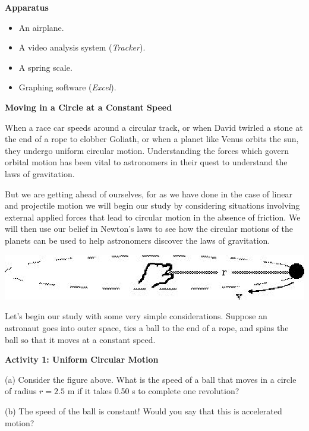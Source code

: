 \textbf{Apparatus}

\begin{itemize}
\item An airplane. 
\item A video analysis system (\textit{Tracker}). 
\item A spring scale. 
\item Graphing software (\textit{Excel}). 
\end{itemize}
\textbf{Moving in a Circle at a Constant Speed }

When a race car speeds around a circular track, or when David twirled a stone
at the end of a rope to clobber Goliath, or when a planet like Venus orbits
the sun, they undergo uniform circular motion. Understanding the forces which
govern orbital motion has been vital to astronomers in their quest to understand
the laws of gravitation. 

But we are getting ahead of ourselves, for as we have done in the case of linear
and projectile motion we will begin our study by considering situations involving
external applied forces that lead to circular motion in the absence of friction.
We will then use our belief in Newton's laws to see how the circular motions
of the planets can be used to help astronomers discover the laws of gravitation.

\vspace{0.3cm}
{\par\centering \includegraphics{centripetal/centripetal_fig2.eps} \par}
\vspace{0.3cm}

Let's begin our study with some very simple considerations. Suppose an astronaut
goes into outer space, ties a ball to the end of a rope, and spins the ball
so that it moves at a constant speed.

\textbf{Activity 1: Uniform Circular Motion }

(a) Consider the figure above. What is the speed of a ball that moves in a circle
of radius $r = 2.5$ m if it takes 0.50 s to complete one revolution?
\vspace{20mm}

(b) The speed of the ball is constant! Would you say that this is accelerated
motion?
\vspace{20mm}

